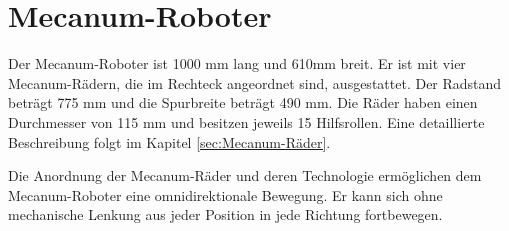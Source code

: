 \section{Mecanum-Roboter}
\label{sec:Mecanum-Roboter}

Der Mecanum-Roboter ist 1000 mm lang und 610mm breit. Er ist mit vier Mecanum-Rädern, die im Rechteck angeordnet sind, ausgestattet. Der Radstand beträgt 775 mm und die Spurbreite beträgt 490 mm. Die Räder haben einen Durchmesser von 115 mm und besitzen jeweils 15 Hilfsrollen. Eine detaillierte Beschreibung folgt im Kapitel \ref{sec:Mecanum-Räder}.

Die Anordnung der Mecanum-Räder und deren Technologie ermöglichen dem Mecanum-Roboter eine omnidirektionale Bewegung. Er kann sich ohne mechanische Lenkung aus jeder Position in jede Richtung fortbewegen.

